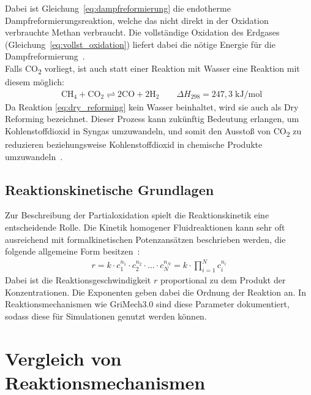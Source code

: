\documentclass[footmark=none]{tubaf-thesis}
\begin{document}
            Dabei ist Gleichung~\ref{eq:dampfreformierung} die endotherme Dampfreformierungsreaktion, welche das nicht direkt in der Oxidation verbrauchte Methan verbraucht. Die vollständige Oxidation des Erdgases (Gleichung~\ref{eq:vollst_oxidation}) liefert dabei die nötige Energie für die Dampfreformierung~\cite{POX_Erdgas}.\\ 
            Falls CO\textsubscript{2} vorliegt, ist auch statt einer Reaktion mit Wasser eine Reaktion mit diesem möglich:
            \begin{align}
                &\mathrm{CH_4 + CO_2 \rightleftharpoons 2CO + 2H_2} \qquad \Delta H_{298} = 247,3 \;\mathrm{kJ/mol}~\label{eq:dry_reforming}
            \end{align}
            Da Reaktion \ref{eq:dry_reforming} kein Wasser beinhaltet, wird sie auch als Dry Reforming bezeichnet. Dieser Prozess kann zukünftig Bedeutung erlangen, um Kohlenstoffdioxid in Syngas umzuwandeln, und somit den  Ausstoß von CO\textsubscript{2} zu reduzieren beziehungsweise Kohlenstoffdioxid in chemische Produkte umzuwandeln~\cite{LESACHE2022100970}. 
        \section{Reaktionskinetische Grundlagen}
            Zur Beschreibung der Partialoxidation spielt die Reaktionskinetik eine entscheidende Rolle. Die Kinetik homogener Fluidreaktionen kann sehr oft ausreichend mit formalkinetischen Potenzansätzen beschrieben werden, die folgende allgemeine Form besitzen~\cite{Emig_Klemm_2017}:
            \begin{align}
                r = k\cdot c_1^{n_1}\cdot c_2^{n_2}\cdot{\dots}\cdot c_N^{n_N} = k \cdot \prod_{i=1}^N c_i^{n_i}
            \end{align}
            Dabei ist die Reaktionsgeschwindigkeit $r$ proportional zu dem Produkt der Konzentrationen. Die Exponenten geben dabei die Ordnung der Reaktion an. In Reaktionsmechanismen wie GriMech3.0 sind diese Parameter dokumentiert, sodass diese für Simulationen genutzt werden können.
\chapter{Vergleich von Reaktionsmechanismen}
\end{document}
